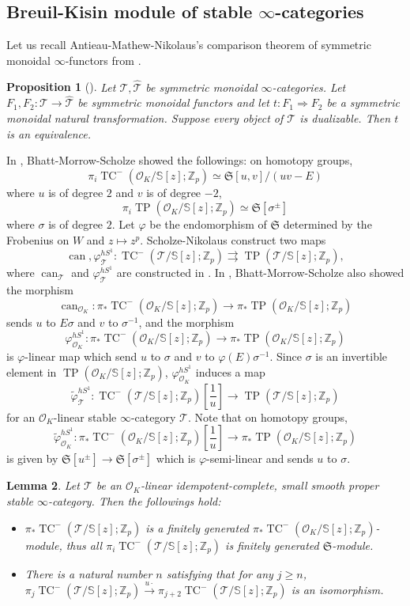 \documentclass[11pt]{amsart}
\newcommand{\Z}{\mathbb{Z}}
\newcommand{\sO}{\mathcal{O}}
\newcommand{\sT}{\mathcal{T}}
\newcommand{\bS}{\mathbb{S}}
\newcommand{\TP}{\operatorname{TP}}
\newcommand{\TCn}{\operatorname{TC}^{-}}
\newcommand{\can}{\operatorname{can}}
\newcommand{\mS}{\mathfrak{S}}
\newtheorem{lemma}{Lemma}[section]
\newtheorem{prop}[lemma]{Proposition}
\theoremstyle{definition}
\theoremstyle{remark}
\numberwithin{equation}{section}
\begin{document}
\subsection{Breuil-Kisin module of stable $\infty$-categories} Let us recall Antieau-Mathew-Nikolaus's comparison theorem of symmetric monoidal $\infty$-functors from \cite{KunnethTP}.
\begin{prop}[{\cite[Proposition 4.6]{KunnethTP}}]\label{compmonoid}
Let $\sT,\hat{\sT}$ be symmetric monoidal $\infty$-categories. Let $F_1,F_2:\sT\to\hat{\sT}$ be symmetric monoidal functors and let $t:F_1\Longrightarrow F_2$ be a symmetric monoidal natural transformation. Suppose every object of $\sT$ is dualizable. Then $t$ is an equivalence.
\end{prop}
In \cite[Proposition 11.10]{BMS2}, Bhatt-Morrow-Scholze showed the followings: on homotopy groups, 
\[
\pi_i \TCn(\sO_K/\bS[z];\Z_p) \simeq \mS[u,v]/(uv-E)
\]
where $u$ is of degree $2$ and $v$ is of degree $-2$, 
\[
\pi_i \TP(\sO_K/\bS[z];\Z_p) \simeq \mS[\sigma^{\pm}]
\]
where $\sigma$ is of degree $2$. Let $\varphi$ be the endomorphism of $\mS$ determined by the Frobenius on $W$ and $z\mapsto z^{p}$. Scholze-Nikolaus construct two maps
\[
\can,\varphi^{hS^1}_\sT:\TCn(\sT/\bS[z];\Z_p) \rightrightarrows \TP(\sT/\bS[z];\Z_p),
\]
where $\can_\sT$ and $\varphi^{hS^1}_\sT$ are constructed in \cite{NS18}. In \cite[Proposition 11.10]{BMS2}, Bhatt-Morrow-Scholze also showed the morphism 
\[
\can_{\sO_K}:\pi_*\TCn(\sO_K/\bS[z];\Z_p) \to \pi_*\TP(\sO_K/\bS[z];\Z_p)
\]
sends $u$ to $E\sigma$ and $v$ to $\sigma^{-1}$, and the morphism
\[
\varphi^{hS^1}_{\sO_K}:\pi_*\TCn(\sO_K/\bS[z];\Z_p) \to \pi_*\TP(\sO_K/\bS[z];\Z_p)
\]
is $\varphi$-linear map which send $u$ to $\sigma$ and $v$ to $\varphi(E) \sigma^{-1}$. Since $\sigma$ is an invertible element in $\TP(\sO_K/\bS[z];\Z_p)$, $\varphi^{hS^1}_{\sO_K}$ induces a map
\begin{equation}\label{localFrob}
\tilde{\varphi}^{hS^1}_{\sT}:\TCn(\sT/\bS[z];\Z_p)[\frac{1}{u}] \to \TP(\sT/\bS[z];\Z_p)
\end{equation}
for an $\sO_K$-linear stable $\infty$-category $\sT$. Note that on homotopy groups,
\[  \tilde{\varphi}^{hS^1}_{\sO_K}:\pi_*\TCn(\sO_K/\bS[z];\Z_p)[\frac{1}{u}] \to \pi_*\TP(\sO_K/\bS[z];\Z_p)
\]
is given by $\mS[u^{\pm}] \to \mS[\sigma^{\pm}]$ which is $\varphi$-semi-linear and sends $u$ to $\sigma$.
\begin{lemma}\label{periodlemma}
Let $\sT$ be an $\sO_K$-linear idempotent-complete, small smooth proper stable $\infty$-category. Then the followings hold:
\begin{itemize}
  \item[(1)] $\pi_*\TCn(\sT/\bS[z];\Z_p)$ is a finitely generated $\pi_*\TCn(\sO_K/\bS[z];\Z_p)$-module, thus all $\pi_i\TCn(\sT/\bS[z];\Z_p)$ is finitely generated $\mS$-module.
  \item[(2)] There is a natural number $n$ satisfying that for any $j \geq n$, $\pi_j\TCn(\sT/\bS[z];\Z_p)\overset{u\cdot }{\to} \pi_{j+2}\TCn(\sT/\bS[z];\Z_p)$ is an isomorphism. 
\end{itemize}
\end{lemma}
\end{document}
